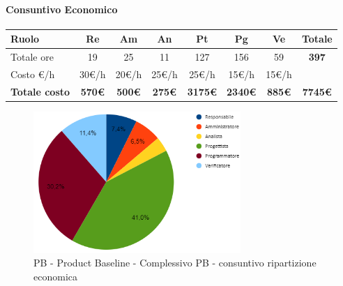 \paragraph{Consuntivo Economico}
\begin{center}
	\renewcommand{\arraystretch}{1.8}
	\begin{tabular}{ |m{6em}|c|c|c|c|c|c|c| }
	\hline
	\textbf{Ruolo} & \textbf{Re} & \textbf{Am} &  \textbf{An} &  \textbf{Pt} &  \textbf{Pg} &  \textbf{Ve} &  \textbf{Totale}\\
    \hline
    Totale ore & 19 & 25 & 11 & 127 & 156 & 59 & \textbf{397}\\
    \hline
    Costo \euro/h & 30\euro/h & 20\euro/h & 25\euro/h & 25\euro/h & 15\euro/h & 15\euro/h & \\
    \hline
    \textbf{Totale costo} & \textbf{570\euro} & \textbf{500\euro} &  \textbf{275\euro} & \textbf{3175\euro} &  \textbf{2340\euro} &  \textbf{885\euro} &  \textbf{7745\euro} \\
    \hline
	\end{tabular}

    \begin{figure}[H]
        \centering\includegraphics[width=0.7\textwidth, height=0.7\textheight, keepaspectratio]{images/consuntivo/consuntivo-PB-costo-totale.png}
        \caption{PB - Product Baseline - Complessivo PB - consuntivo ripartizione economica}
    \end{figure}
\end{center}

